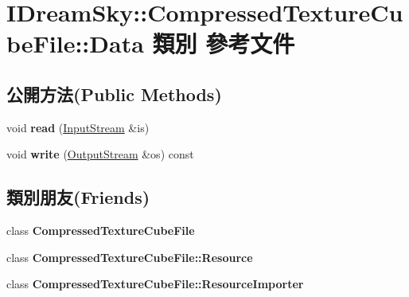 \hypertarget{class_i_dream_sky_1_1_compressed_texture_cube_file_1_1_data}{}\section{I\+Dream\+Sky\+:\+:Compressed\+Texture\+Cube\+File\+:\+:Data 類別 參考文件}
\label{class_i_dream_sky_1_1_compressed_texture_cube_file_1_1_data}
\subsection*{公開方法(Public Methods)}
\begin{DoxyCompactItemize}
\item 
void {\bfseries read} (\hyperlink{class_i_dream_sky_1_1_input_stream}{Input\+Stream} \&is)\hypertarget{class_i_dream_sky_1_1_compressed_texture_cube_file_1_1_data_ab15d5d37f9d74bbc17bc6ec1cb0140be}{}\label{class_i_dream_sky_1_1_compressed_texture_cube_file_1_1_data_ab15d5d37f9d74bbc17bc6ec1cb0140be}

\item 
void {\bfseries write} (\hyperlink{class_i_dream_sky_1_1_output_stream}{Output\+Stream} \&os) const \hypertarget{class_i_dream_sky_1_1_compressed_texture_cube_file_1_1_data_af736495565508b763297cfa6bd6589e9}{}\label{class_i_dream_sky_1_1_compressed_texture_cube_file_1_1_data_af736495565508b763297cfa6bd6589e9}

\end{DoxyCompactItemize}
\subsection*{類別朋友(Friends)}
\begin{DoxyCompactItemize}
\item 
class {\bfseries Compressed\+Texture\+Cube\+File}\hypertarget{class_i_dream_sky_1_1_compressed_texture_cube_file_1_1_data_a63a179d595b6d0abfb05c44d067e3a8b}{}\label{class_i_dream_sky_1_1_compressed_texture_cube_file_1_1_data_a63a179d595b6d0abfb05c44d067e3a8b}

\item 
class {\bfseries Compressed\+Texture\+Cube\+File\+::\+Resource}\hypertarget{class_i_dream_sky_1_1_compressed_texture_cube_file_1_1_data_a7e1de0b80a712fd90724f5aefc5c547c}{}\label{class_i_dream_sky_1_1_compressed_texture_cube_file_1_1_data_a7e1de0b80a712fd90724f5aefc5c547c}

\item 
class {\bfseries Compressed\+Texture\+Cube\+File\+::\+Resource\+Importer}\hypertarget{class_i_dream_sky_1_1_compressed_texture_cube_file_1_1_data_ad808ef83bb3e0256cf00e349e4dbf791}{}\label{class_i_dream_sky_1_1_compressed_texture_cube_file_1_1_data_ad808ef83bb3e0256cf00e349e4dbf791}

\end{DoxyCompactItemize}


